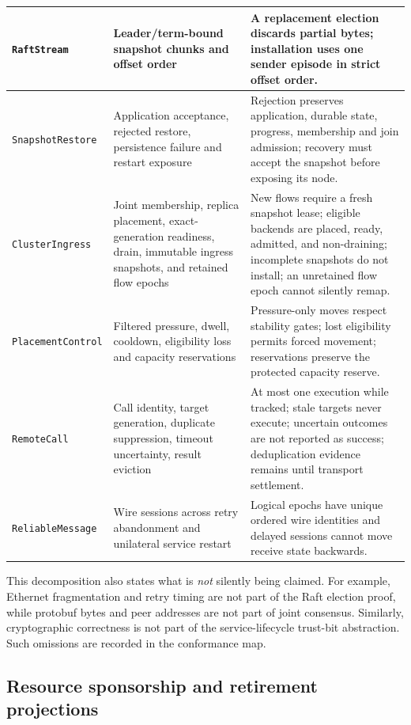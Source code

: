 \begin{longtable}{|p{}|p{}|p{}|}
\hline
\texttt{RaftStream} & Leader/term-bound snapshot chunks and offset
    order & A replacement election discards partial bytes; installation uses
    one sender episode in strict offset order. \\
\hline
\texttt{SnapshotRestore} & Application acceptance, rejected restore,
    persistence failure and restart exposure & Rejection preserves application,
    durable state, progress, membership and join admission; recovery must accept
    the snapshot before exposing its node. \\
\hline
\texttt{ClusterIngress} & Joint membership, replica placement,
    exact-generation readiness, drain, immutable ingress snapshots, and
    retained flow epochs & New flows require a fresh snapshot lease; eligible backends are
    placed, ready, admitted, and non-draining; incomplete snapshots do not
    install; an unretained flow epoch cannot silently remap. \\
\hline
\texttt{PlacementControl} & Filtered pressure, dwell, cooldown,
    eligibility loss and capacity reservations & Pressure-only moves respect
    stability gates; lost eligibility permits forced movement; reservations
    preserve the protected capacity reserve. \\
\hline
\texttt{RemoteCall} & Call identity, target generation, duplicate
    suppression, timeout uncertainty, result eviction & At most one execution
    while tracked; stale targets never execute; uncertain outcomes are not
    reported as success; deduplication evidence remains until transport
    settlement. \\
\hline
\texttt{ReliableMessage} & Wire sessions across retry abandonment and
    unilateral service restart & Logical epochs have unique ordered wire
    identities and delayed sessions cannot move receive state backwards. \\
\hline
\end{longtable}
\normalsize

This decomposition also states what is \emph{not} silently being claimed. For
example, Ethernet fragmentation and retry timing are not part of the Raft
election proof, while protobuf bytes and peer addresses are not part of joint
consensus. Similarly, cryptographic correctness is not part of the service-lifecycle
trust-bit abstraction. Such omissions are recorded in the conformance map.

\subsection{Resource sponsorship and retirement projections}

